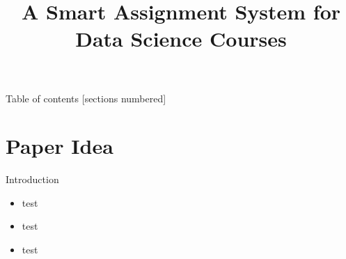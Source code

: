 \documentclass[9pt]{beamer}
\title{A Smart Assignment System for Data Science Courses}
\begin{document}







\maketitle






\begin{frame}{Table of contents}
 [sections numbered]
   \tableofcontents[hideallsubsections]
 
 
\end{frame}






\section{Paper Idea}







\begin{frame}[fragile]{Introduction}


 

\begin{itemize}
  \item test    
  \item test    
  \item test    
  
\end{itemize}



\end{frame}
\end{document}
